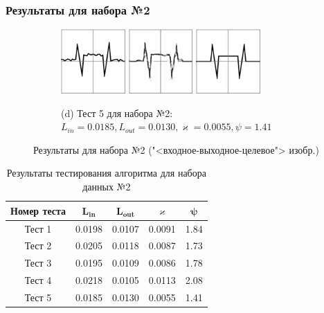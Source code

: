 \documentclass{beamer}
\renewcommand{\kappa}{\varkappa}
\begin{document}
\begin{frame}
	\frametitle{Результаты для набора №2 \hyperlink{pril6}{}}
	\vspace{-0.5em}
	\begin{figure}[!hp]
		\centering
		\begin{subfigure}{\textwidth}
		\centering
		\includegraphics[width=0.27\textwidth]{res_n1_9}
		\hfill
		\includegraphics[width=0.27\textwidth]{res_n2_10}
		\hfill
		\includegraphics[width=0.27\textwidth]{5}
		\caption*{\small (d) Тест 5 для набора №2: $L_{in} = 0.0185, L_{out} = 0.0130, \kappa = 0.0055, \psi = 1.41$}
	\end{subfigure}
	\vspace{-2em}
	\caption{Результаты для набора №2 ("<входное-выходное-целевое"> изобр.)}
\end{figure}
\vspace{-1.5em}
\begin{table}[!ht]
\centering
\caption{Результаты тестирования алгоритма для набора данных №2 }
\vspace{-0.75em}
	\large
	\begin{tabular}{|c|c|c|c|c|}
		\hline
		\textbf{Номер теста} & \(\mathbf{L_{in}}\) & \(\mathbf{L_{out}}\) & \(\mathbf{\kappa}\) & \(\mathbf{\psi}\) \\ \hline
		Тест 1 & 0.0198 & 0.0107 & 0.0091 & 1.84 \\ \hline
		Тест 2 & 0.0205 & 0.0118 & 0.0087 & 1.73 \\ \hline
		Тест 3 & 0.0195 & 0.0109 & 0.0086 & 1.78 \\ \hline
		Тест 4 & 0.0218 & 0.0105 & 0.0113 & 2.08 \\ \hline
		Тест 5 & 0.0185 & 0.0130 & 0.0055 & 1.41 \\ \hline
	\end{tabular}
	\label{tab:results2}
\end{table}
\end{frame}
\end{document}
